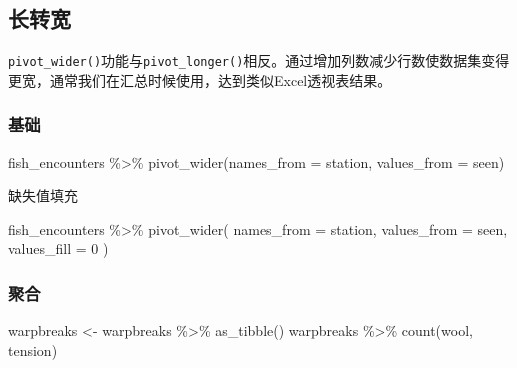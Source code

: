 \documentclass[
]{book}
\newenvironment{Shaded}{\begin{snugshade}}{\end{snugshade}}
\newcommand{\AttributeTok}[1]{\textcolor[rgb]{0.77,0.63,0.00}{#1}}
\newcommand{\DecValTok}[1]{\textcolor[rgb]{0.00,0.00,0.81}{#1}}
\newcommand{\FunctionTok}[1]{\textcolor[rgb]{0.00,0.00,0.00}{#1}}
\newcommand{\NormalTok}[1]{#1}
\newcommand{\OtherTok}[1]{\textcolor[rgb]{0.56,0.35,0.01}{#1}}
\newcommand{\SpecialCharTok}[1]{\textcolor[rgb]{0.00,0.00,0.00}{#1}}
\begin{document}
\hypertarget{ux957fux8f6cux5bbd}{%
\subsection{长转宽}\label{ux957fux8f6cux5bbd}}

\texttt{pivot\_wider()}功能与\texttt{pivot\_longer()}相反。通过增加列数减少行数使数据集变得更宽，通常我们在汇总时候使用，达到类似Excel透视表结果。

\hypertarget{ux57faux7840-2}{%
\subsubsection{基础}\label{ux57faux7840-2}}

\begin{Shaded}
\begin{Highlighting}[]
\NormalTok{fish\_encounters }\SpecialCharTok{\%\textgreater{}\%} \FunctionTok{pivot\_wider}\NormalTok{(}\AttributeTok{names\_from =}\NormalTok{ station, }\AttributeTok{values\_from =}\NormalTok{ seen)}
\end{Highlighting}
\end{Shaded}

缺失值填充

\begin{Shaded}
\begin{Highlighting}[]
\NormalTok{fish\_encounters }\SpecialCharTok{\%\textgreater{}\%} \FunctionTok{pivot\_wider}\NormalTok{(}
  \AttributeTok{names\_from =}\NormalTok{ station, }
  \AttributeTok{values\_from =}\NormalTok{ seen,}
  \AttributeTok{values\_fill =} \DecValTok{0}
\NormalTok{)}
\end{Highlighting}
\end{Shaded}

\hypertarget{ux805aux5408}{%
\subsubsection{聚合}\label{ux805aux5408}}

\begin{Shaded}
\begin{Highlighting}[]
\NormalTok{warpbreaks }\OtherTok{\textless{}{-}}\NormalTok{ warpbreaks }\SpecialCharTok{\%\textgreater{}\%} \FunctionTok{as\_tibble}\NormalTok{() }
\NormalTok{warpbreaks }\SpecialCharTok{\%\textgreater{}\%} \FunctionTok{count}\NormalTok{(wool, tension)}
\end{Highlighting}
\end{Shaded}
\end{document}
